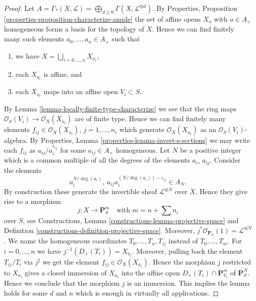 \begin{proof}
Let
$A = \Gamma_*(X, \mathcal{L}) =
\bigoplus_{d \geq 0} \Gamma(X, \mathcal{L}^{\otimes d})$.
By Properties, Proposition \ref{properties-proposition-characterize-ample}
the set of affine opens $X_a$ with $a \in A_{+}$ homogeneous forms
a basis for the topology of $X$. Hence we can find finitely
many such elements $a_0, \ldots, a_n \in A_{+}$ such that
\begin{enumerate}
\item we have $X = \bigcup_{i = 0, \ldots, n} X_{a_i}$,
\item each $X_{a_i}$ is affine, and
\item each $X_{a_i}$ maps into an affine open $V_i \subset S$.
\end{enumerate}
By Lemma \ref{lemma-locally-finite-type-characterize}
we see that the ring maps
$\mathcal{O}_S(V_i) \to \mathcal{O}_X(X_{a_i})$ are
of finite type. Hence we can find finitely many
elements $f_{ij} \in \mathcal{O}_X(X_{a_i})$, $j = 1, \ldots, n_i$
which generate $\mathcal{O}_X(X_{a_i})$ as an $\mathcal{O}_S(V_i)$-algebra.
By Properties, Lemma \ref{properties-lemma-invert-s-sections}
we may write each
$f_{ij}$ as $a_{ij}/a_i^{e_{ij}}$ for some
$a_{ij} \in A_{+}$ homogeneous. Let $N$ be a positive integer which
is a common multiple of all the degrees of the elements
$a_i$, $a_{ij}$. Consider the elements
$$
a_i^{N/\deg(a_i)}, \ a_{ij}a_i^{(N/\deg(a_i)) - e_{ij}} \in A_N.
$$
By construction these generate the invertible sheaf
$\mathcal{L}^{\otimes N}$ over $X$. Hence they give rise
to a morphism
$$
j : X \longrightarrow
\mathbf{P}_S^{m}
\quad
\text{with } m = n + \sum n_i
$$
over $S$, see Constructions, Lemma \ref{constructions-lemma-projective-space}
and Definition \ref{constructions-definition-projective-space}.
Moreover, $j^*\mathcal{O}_{\mathbf{P}_S}(1) = \mathcal{L}^{\otimes N}$.
We name the homogeneous coordinates $T_0, \ldots, T_n, T_{ij}$
instead of $T_0, \ldots, T_m$.
For $i = 0, \ldots, n$ we have $j^{-1}(D_{+}(T_i)) = X_{a_i}$.
Moreover, pulling back the element $T_{ij}/T_i$ via $j^\sharp$ we
get the element $f_{ij} \in \mathcal{O}_X(X_{a_i})$.
Hence the morphism $j$ restricted to $X_{a_i}$
gives a closed immersion of $X_{a_i}$ into the affine open
$D_{+}(T_i) \cap \mathbf{P}^m_{V_i}$ of $\mathbf{P}^N_S$.
Hence we conclude that the morphism $j$ is an immersion.
This implies the lemma holds for some $d$ and $n$ which is enough
in virtually all applications.


\end{proof}
